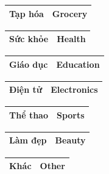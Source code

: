 \begin{table}[htbp]
\centering
\begin{tabularx}{\textwidth}{|l|X|}
\hline
Tạp hóa & Grocery \\ \hline
\end{tabularx}
\end{table}

\begin{table}[htbp]
\centering
\begin{tabularx}{\textwidth}{|l|X|}
\hline
Sức khỏe & Health \\ \hline
\end{tabularx}
\end{table}

\begin{table}[htbp]
\centering
\begin{tabularx}{\textwidth}{|l|X|}
\hline
Giáo dục & Education \\ \hline
\end{tabularx}
\end{table}

\begin{table}[htbp]
\centering
\begin{tabularx}{\textwidth}{|l|X|}
\hline
Điện tử & Electronics \\ \hline
\end{tabularx}
\end{table}

\begin{table}[htbp]
\centering
\begin{tabularx}{\textwidth}{|l|X|}
\hline
Thể thao & Sports \\ \hline
\end{tabularx}
\end{table}

\begin{table}[htbp]
\centering
\begin{tabularx}{\textwidth}{|l|X|}
\hline
Làm đẹp & Beauty \\ \hline
\end{tabularx}
\end{table}

\begin{table}[htbp]
\centering
\begin{tabularx}{\textwidth}{|l|X|}
\hline
Khác & Other \\ \hline
\end{tabularx}
\end{table}



